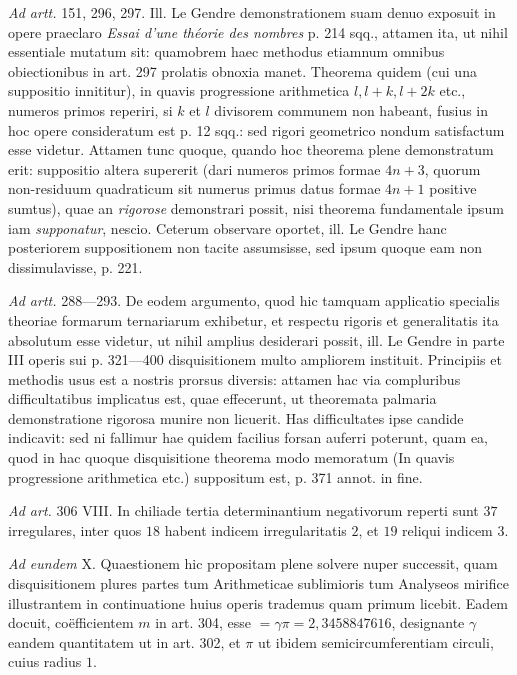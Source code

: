 \textit{Ad artt.} 151, 296, 297. Ill. Le Gendre demonstrationem suam denuo exposuit in opere praeclaro \textit{Essai d'une théorie des nombres} p. 214 sqq., attamen ita, ut nihil essentiale mutatum sit: quamobrem haec methodus etiamnum omnibus obiectionibus in art. 297 prolatis obnoxia manet. Theorema quidem (cui una suppositio innititur), in quavis progressione arithmetica \(l,\allowbreak l+k,\allowbreak l+2k\) etc., numeros primos reperiri, si \(k\) et \(l\) divisorem communem non habeant, fusius in hoc opere consideratum est p. 12 sqq.: sed rigori geometrico nondum satisfactum esse videtur. Attamen tunc quoque, quando hoc theorema plene demonstratum erit: suppositio altera supererit (dari numeros primos formae \(4n+3\), quorum non-residuum quadraticum sit numerus primus datus formae \(4n+1\) positive sumtus), quae an \textit{rigorose} demonstrari possit, nisi theorema fundamentale ipsum iam \textit{supponatur}, nescio. Ceterum observare oportet, ill. Le Gendre hanc posteriorem suppositionem non tacite assumsisse, sed ipsum quoque eam non dissimulavisse, p. 221.

\textit{Ad artt.} 288---293. De eodem argumento, quod hic tamquam applicatio specialis theoriae formarum ternariarum exhibetur, et respectu rigoris et generalitatis ita absolutum esse videtur, ut nihil amplius desiderari possit, ill. Le Gendre in parte III operis sui p. 321---400 disquisitionem multo ampliorem instituit. Principiis et methodis usus est a nostris prorsus diversis: attamen hac via compluribus difficultatibus implicatus est, quae effecerunt, ut theoremata palmaria demonstratione rigorosa munire non licuerit. Has difficultates ipse candide indicavit: sed ni fallimur hae quidem facilius forsan auferri poterunt, quam ea, quod in hac quoque disquisitione theorema modo memoratum (In quavis progressione arithmetica etc.) suppositum est, p. 371 annot. in fine.

\textit{Ad art.} 306 VIII. In chiliade tertia determinantium negativorum reperti sunt \(37\) irregulares, inter quos \(18\) habent indicem irregularitatis \(2\), et \(19\) reliqui indicem \(3\).

\textit{Ad eundem} X. Quaestionem hic propositam plene solvere nuper successit, quam disquisitionem plures partes tum Arithmeticae sublimioris tum Analyseos mirifice illustrantem in continuatione huius operis trademus quam primum licebit. Eadem docuit, coëfficientem \(m\) in art. 304, esse \(=\gamma\pi=2{,}3458847616\), designante \(\gamma\) eandem quantitatem ut in art. 302, et \(\pi\) ut ibidem semicircumferentiam circuli, cuius radius \(1\).

